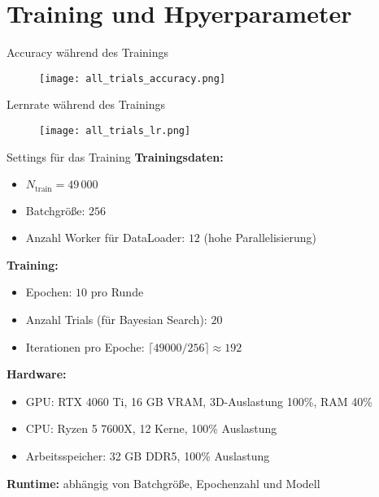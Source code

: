 \section{Training und Hpyerparameter}

\begin{frame}{Accuracy während des Trainings}
    \begin{figure}
        \centering
        \texttt{[image: all\_trials\_accuracy.png]}
    \end{figure}
\end{frame}



\begin{frame}{Lernrate während des Trainings}
    \begin{figure}
        \centering
        \texttt{[image: all\_trials\_lr.png]}
    \end{figure}
\end{frame}

\begin{frame}{Settings für das Training}
\textbf{Trainingsdaten:}
\begin{itemize}
    \item $N_{\text{train}} = 49\,000$
    \item Batchgröße: $256$ 
    \item Anzahl Worker für DataLoader: $12$ (hohe Parallelisierung)
\end{itemize}

\textbf{Training:}
\begin{itemize}
    \item Epochen: $10$ pro Runde
    \item Anzahl Trials (für Bayesian Search): $20$
    \item Iterationen pro Epoche: $\lceil 49000 / 256 \rceil \approx 192$
\end{itemize}

\textbf{Hardware:}
\begin{itemize}
    \item GPU: RTX 4060 Ti, 16 GB VRAM, 3D-Auslastung 100\%, RAM 40\%
    \item CPU: Ryzen 5 7600X, 12 Kerne, 100\% Auslastung
    \item Arbeitsspeicher: 32 GB DDR5, 100\% Auslastung
\end{itemize}

\textbf{Runtime:} abhängig von Batchgröße, Epochenzahl und Modell
\end{frame}

